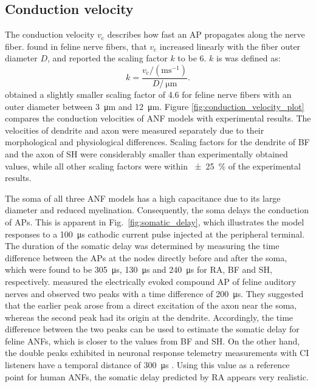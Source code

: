 \documentclass[utf8]{frontiersSCNS} %
\newcommand{\T}[1]{\text{#1}}
\begin{document}
\subsection{Conduction velocity}
\label{subsec:conduction_velocity}
The conduction velocity $v_{\T{c}}$ describes how fast an AP propagates along the nerve fiber. \cite{Hursh1939} found in feline nerve fibers, that $v_{\T{c}}$ increased linearly with the fiber outer diameter $D$, and reported the scaling factor $k$ to be 6. $k$ is was defined as:
\begin{equation}
k=\frac{v_{\T{c}}/(\T{ms}^{-1})}{D/\SI{}{\micro\meter}}.
\label{equ:scaling_factor}
\end{equation}
\cite{Boyd1979} obtained a slightly smaller scaling factor of 4.6 for feline nerve fibers with an outer diameter between \SI{3}{\micro\meter} and \SI{12}{\micro\meter}.
Figure \ref{fig:conduction_velocity_plot} compares the conduction velocities of ANF models with experimental results.
The velocities of dendrite and axon were measured separately due to their morphological and physiological differences. Scaling factors for the dendrite of BF and the axon of SH were considerably smaller than experimentally obtained values, while all other scaling factors were within \SI{\pm 25}{\percent} of the experimental results.

%

The soma of all three ANF models has a high capacitance due to its large diameter and reduced myelination. Consequently, the soma delays the conduction of APs. This is apparent in Fig.\ \ref{fig:somatic_delay}, which illustrates the model responses to a \SI{100}{\micro\second} cathodic current pulse injected at the peripheral terminal. The duration of the somatic delay was determined by measuring the time difference between the APs at the nodes directly before and after the soma, which were found to be \SI{305}{\micro\second}, \SI{130}{\micro\second} and \SI{240}{\micro\second} for RA, BF and SH, respectively.
\cite{Stypulkowski1984} measured the electrically evoked compound AP of feline auditory nerves and observed two peaks with a time difference of \SI{200}{\micro\second}. They suggested that the earlier peak arose from a direct excitation of the axon near the soma, whereas the second peak had its origin at the dendrite. Accordingly, the time difference between the two peaks can be used to estimate the somatic delay for feline ANFs, which is closer to the values from BF and SH. On the other hand, the double peaks exhibited in neuronal response telemetry measurements with CI listeners have a temporal distance of \SI{300}{\micro\second} \citep{Lai2000}. Using this value as a reference point for human ANFs, the somatic delay predicted by RA appears very realistic.
\end{document}
